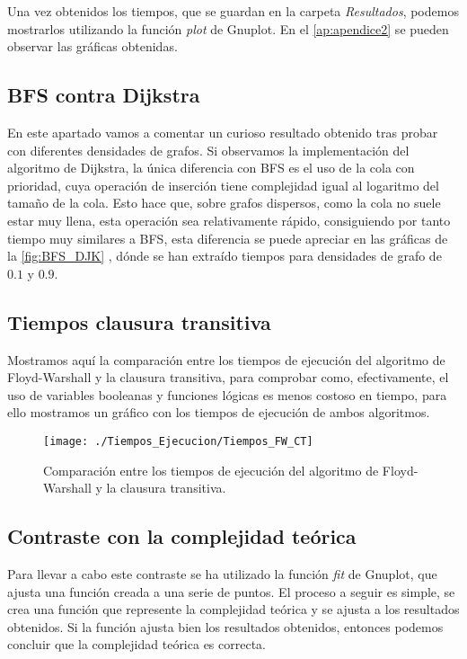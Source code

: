 Una vez obtenidos los tiempos, que se guardan en la carpeta \textit{Resultados}, podemos mostrarlos utilizando la función \textit{plot} de Gnuplot. En el \autoref{ap:apendice2} se pueden observar las gráficas obtenidas. \\

\subsection{BFS contra Dijkstra}

En este apartado vamos a comentar un curioso resultado obtenido tras probar con diferentes densidades de grafos. Si observamos la implementación del algoritmo de Dijkstra, la única diferencia con BFS es el uso de la cola con prioridad, cuya operación de inserción tiene complejidad igual al logaritmo del tamaño de la cola. Esto hace que, sobre grafos dispersos, como la cola no suele estar muy llena, esta operación sea relativamente rápido, consiguiendo por tanto tiempo muy similares a BFS, esta diferencia se puede apreciar en las gráficas de la \autoref{fig:BFS_DJK} , dónde se han extraído tiempos para densidades de grafo de $0.1$ y $0.9$.

\subsection{Tiempos clausura transitiva}

Mostramos aquí la comparación entre los tiempos de ejecución del algoritmo de Floyd-Warshall y la clausura transitiva, para comprobar como, efectivamente, el uso de variables booleanas y funciones lógicas es menos costoso en tiempo, para ello mostramos un gráfico con los tiempos de ejecución de ambos algoritmos.

\begin{figure}[htb]
	\centering
	\texttt{[image: ./Tiempos\_Ejecucion/Tiempos\_FW\_CT]}
	
	\caption{Comparación entre los tiempos de ejecución del algoritmo de Floyd-Warshall y la clausura transitiva.}
	\label{fig:FW_CT}
\end{figure}

\subsection{Contraste con la complejidad teórica}

Para llevar a cabo este contraste se ha utilizado la función \textit{fit} de Gnuplot, que ajusta una función creada a una serie de puntos. El proceso a seguir es simple, se crea una función que represente la complejidad teórica y se ajusta a los resultados obtenidos. Si la función ajusta bien los resultados obtenidos, entonces podemos concluir que la complejidad teórica es correcta. \\

